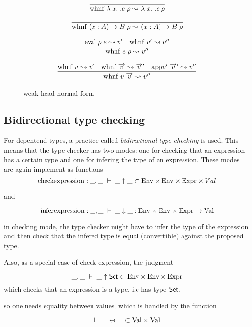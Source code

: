 \begin{figure}[p]
\[
\begin{array}{c}

\infer{\Whnf{\lam x . e \; \rho}{\lam x . e \; \rho}}{}

\end{array}
\]

\[
\begin{array}{c}
\infer{\Whnf{\EPi{x}{A}{B} \; \rho}{\EPi{x}{A}{B} \; \rho}}{}
\end{array}
\]

\[
\begin{array}{c}
\infer{\Whnf{e \; \rho}{v''}}
{\Eval{\rho}{e}{v'}
& \Whnf{v'}{v''} 
}
\end{array}
\]

\[
\begin{array}{c}
\infer{\Whnf{v \; \vec{v}}{v''}}
{
\Whnf{v}{v'}
& \Whnf{\vec{v}}{\vec{v}'}
& {\App{v'}{\vec{v}'}{v''}}
}
\end{array}
\]

\caption{weak head normal form}
\end{figure}

\subsection{Bidirectional type checking} 
For depentend types, a practice called \emph{bidirectional type checking} is used.
This means that the type checker has two modes:
one for checking that an expression has a certain type and one for infering the type of an expression.
These modes are again implement as functions
\[ \mathrm{check expression} :  \_,\_\;\vdash\;\_\uparrow\_ \subset \mathrm{Env} \times \mathrm{Env} \times \mathrm{Expr} \times Val\]

and

\[ \mathrm{infer expression} : \_,\_\;\vdash\;\_\downarrow\_ : \mathrm{Env} \times \mathrm{Env} \times \mathrm{Expr} \rightarrow \mathrm{Val}\]

in checking mode, the type checker might have to infer the type of the expression and then check that the infered
type is equal (convertible) against the proposed type.

Also, as a special case of check expression, the judgment 

\[ \_,\_\;\vdash\;\_\uparrow\mathsf{Set} \subset \mathrm{Env} \times \mathrm{Env} \times \mathrm{Expr}\]
which checks that an expression is a type, i.e has type $\mathsf{Set}$.

so one needs equality between values, which is handled by the function

\[\vdash\;\_\leftrightarrow\_ \subset \mathrm{Val} \times \mathrm{Val} \]



